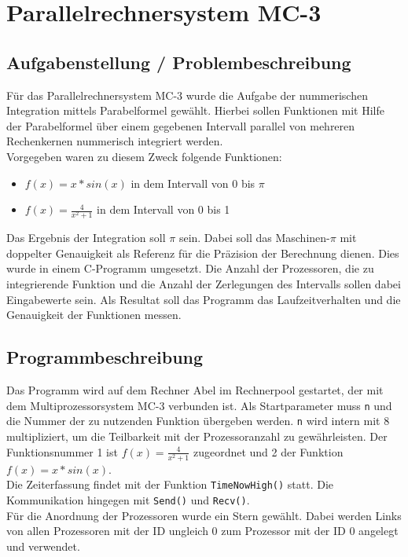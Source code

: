 \documentclass[a4paper,12pt]{scrartcl}
\begin{document}
\section{Parallelrechnersystem MC-3}
\subsection{Aufgabenstellung / Problembeschreibung}
F\"ur das Parallelrechnersystem MC-3 wurde die Aufgabe der nummerischen Integration mittels Parabelformel gew\"ahlt. Hierbei sollen Funktionen mit Hilfe der
Parabelformel \"uber einem gegebenen Intervall parallel von mehreren Rechenkernen nummerisch integriert werden.\\
Vorgegeben waren zu diesem Zweck folgende Funktionen:
\begin{itemize}
 \item $f(x) = x*sin(x)$ in dem Intervall von 0 bis $\pi$
 \item $f(x) = \frac{4}{x^2+1}$ in dem Intervall von 0 bis 1
\end{itemize}
Das Ergebnis der Integration soll $\pi$ sein. Dabei soll das Maschinen-$\pi$ mit doppelter Genauigkeit als Referenz f\"ur die Pr\"azision der Berechnung
dienen. Dies wurde in einem C-Programm umgesetzt. Die Anzahl der Prozessoren, die zu integrierende Funktion und die Anzahl der Zerlegungen des Intervalls sollen
dabei Eingabewerte sein. Als Resultat soll das Programm das Laufzeitverhalten und die Genauigkeit der Funktionen messen.

\subsection{Programmbeschreibung}
Das Programm wird auf dem Rechner Abel im Rechnerpool gestartet, der mit dem Multiprozessorsystem MC-3 verbunden ist. Als Startparameter muss \texttt{n} und
die Nummer der zu nutzenden Funktion \"ubergeben werden. \texttt{n} wird intern mit 8 multipliziert, um die Teilbarkeit mit der Prozessoranzahl zu
gew\"ahrleisten. Der Funktionsnummer 1 ist $f(x) = \frac{4}{x^2+1}$ zugeordnet und 2 der Funktion $f(x) = x*sin(x)$.\\

Die Zeiterfassung findet mit der Funktion \texttt{TimeNowHigh()} statt. Die Kommunikation hingegen mit \texttt{Send()} und \texttt{Recv()}.\\
F\"ur die Anordnung der Prozessoren wurde ein Stern gew\"ahlt. Dabei werden Links von allen Prozessoren mit der ID ungleich 0 zum Prozessor mit der ID 0
angelegt und verwendet.\\
\end{document}
